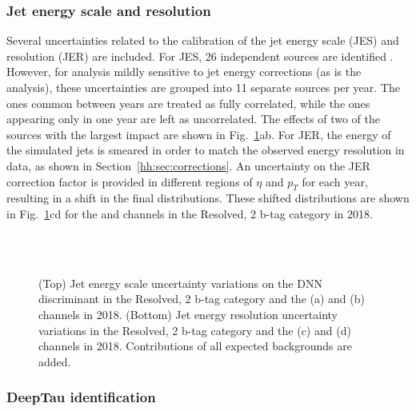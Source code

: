 \documentclass[../main.tex]{subfiles}
\begin{document}
\subsubsection*{Jet energy scale and resolution}

Several uncertainties related to the calibration of the jet energy scale (JES) and resolution (JER) are included. For JES, 26 independent sources are identified \cite{hh:corr:smearing_8TeV}. However, for analysis mildly sensitive to jet energy corrections (as is the \hhbbtt{} analysis), these uncertainties are grouped into 11 separate sources per year. The ones common between years are treated as fully correlated, while the ones appearing only in one year are left as uncorrelated. The effects of two of the sources with the largest impact are shown in Fig.~\ref{hh:fig:jec_syst}ab. For JER, the energy of the simulated jets is smeared in order to match the observed energy resolution in data, as shown in Section~\ref{hh:sec:corrections}. An uncertainty on the JER correction factor is provided in different regions of $\eta$ and $p_T$ for each year, resulting in a shift in the final distributions. These shifted distributions are shown in Fig.~\ref{hh:fig:jec_syst}cd for the \taue\tauh{} and \tauh\tauh{} channels in the Resolved, 2 b-tag category in 2018.

\begin{figure}[h!]
\begin{center}
\\
\\
\end{center}
\caption[Jet energy corrections' uncertainties]{(Top) Jet energy scale uncertainty variations on the DNN discriminant in the Resolved, 2 b-tag category and the \taumu\tauh{} (a) and \tauh\tauh{} (b) channels in 2018. (Bottom) Jet energy resolution uncertainty variations in the Resolved, 2 b-tag category and the \taue\tauh{} (c) and \tauh\tauh{} (d) channels in 2018. Contributions of all expected backgrounds are added.}
\label{hh:fig:jec_syst}
\end{figure}


\subsubsection*{DeepTau identification}
\end{document}
